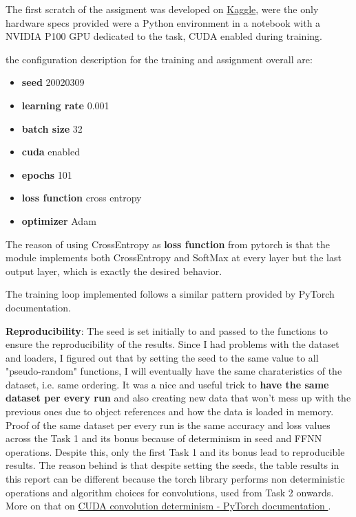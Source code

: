 \documentclass[11pt]{scrartcl}
\begin{document}
The first scratch of the assigment was developed on \href{https://www.kaggle.com/}{Kaggle}, 
were the only hardware specs provided were a Python environment in a notebook 
with a NVIDIA P100 GPU dedicated to the task,
CUDA enabled during training.

the configuration description for the training and assignment overall are:

\begin{itemize}
	\item \textbf{seed} 20020309 
	\item \textbf{learning rate} 0.001
	\item \textbf{batch size} 32
	\item \textbf{cuda} enabled
	\item \textbf{epochs} 101
	\item \textbf{loss function} cross entropy 
	\item \textbf{optimizer} Adam
\end{itemize}

The reason of using CrossEntropy as \textbf{loss function} from pytorch is that the 
module implements both CrossEntropy and SoftMax at every layer but the last output layer,
which is exactly the desired behavior.

The training loop implemented follows a similar pattern provided by PyTorch documentation.

\textbf{Reproducibility}:
The seed is set initially to 
and passed to the functions
to ensure the reproducibility of the results.
Since I had problems with the dataset and loaders, 
I figured out that by setting the seed to the same value
to all "pseudo-random" functions,
I will eventually have the same charateristics of the dataset, 
i.e. same ordering.
It was a nice and useful trick to \textbf{have the same dataset per every run}
and also creating new data that won't mess up with the previous ones due to 
object references and how the data is loaded in memory.
Proof of the same dataset per every run is the same accuracy and loss values
across the Task 1 and its bonus because of determinism in seed and FFNN operations.
Despite this, only the first Task 1 and its bonus lead to 
reproducible results.
The reason behind is that despite setting the seeds, 
the table results in this report can be different because
the torch library performs non deterministic operations
and algorithm choices for convolutions, used from Task 2 onwards.
More on that on \href{https://pytorch.org/docs/stable/notes/randomness.html}{
	CUDA convolution determinism - PyTorch documentation
}.
\end{document}
